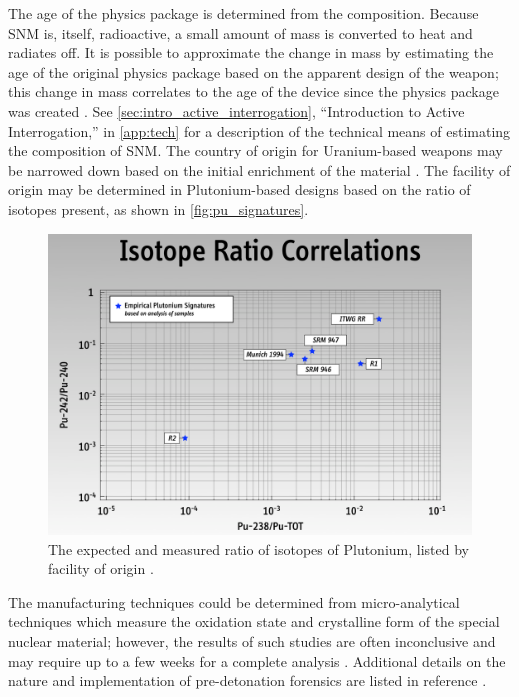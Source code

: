 \documentclass{report}
\begin{document}
The age of the physics package is determined from the composition. Because SNM is, itself, radioactive, a small amount of mass is converted to heat and radiates off. It is possible to approximate the change in mass by estimating the age of the original physics package based on the apparent design of the weapon; this change in mass correlates to the age of the device since the physics package was created \cite{Inn2013}. See \autoref{sec:intro_active_interrogation}, \enquote{Introduction to Active Interrogation,} in \autoref{app:tech} for a description of the technical means of estimating the composition of SNM. The country of origin for Uranium-based weapons may be narrowed down based on the initial enrichment of the material \cite{Defense1998}. The facility of origin may be determined in Plutonium-based designs based on the ratio of isotopes present, as shown in \autoref{fig:pu_signatures}.

\begin{figure}
 \centering
 \includegraphics[trim = 0cm 0cm 0cm 0cm, clip,scale=0.3]{./figures/pu_signatures.png}
   \caption{The expected and measured ratio of isotopes of Plutonium, listed by facility of origin \cite{B412922A}.}
     \label{fig:pu_signatures}
\end{figure}


The manufacturing techniques could be determined from micro-analytical techniques which measure the oxidation state and crystalline form of the special nuclear material; however, the results of such studies are often inconclusive and may require up to a few weeks for a complete analysis \cite{Drell1995}. Additional details on the nature and implementation of pre-detonation forensics are listed in reference \cite{Doyle2011}. 
\end{document}
